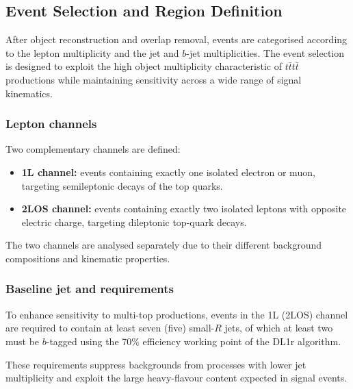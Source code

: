 \subsection{Event Selection and Region Definition}
\label{sec:event_selection}

After object reconstruction and overlap removal,
events are categorised according to the lepton multiplicity
and the jet and $b$-jet multiplicities.
The event selection is designed to exploit the high object
multiplicity characteristic of $t\bar{t}t\bar{t}$ productions
while maintaining sensitivity across a wide range of signal
kinematics.

\subsubsection{Lepton channels}

Two complementary channels are defined:

\begin{itemize}
\item \textbf{1L channel:} events containing exactly one isolated
electron or muon, targeting semileptonic decays of the top quarks.

\item \textbf{2LOS channel:} events containing exactly two isolated
leptons with opposite electric charge, targeting dileptonic top-quark
decays.
\end{itemize}

The two channels are analysed separately due to their different
background compositions and kinematic properties.

\subsubsection{Baseline jet and \bJetHead{} requirements}

To enhance sensitivity to multi-top productions,
events in the 1L (2LOS) channel are required to contain
at least seven (five) small-$R$ jets,
of which at least two must be $b$-tagged using
the 70\% efficiency working point of the DL1r algorithm.

These requirements suppress backgrounds from processes
with lower jet multiplicity and exploit the large
heavy-flavour content expected in signal events.

